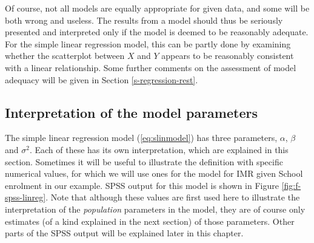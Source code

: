 \documentclass[11pt,a4paper,openany]{book}
\begin{document}
Of course, not all models are equally appropriate for given data, and
some will be both wrong and useless. The results from a model should
thus be seriously presented and interpreted only if the model is deemed
to be reasonably adequate. For the simple linear regression model, this
can be partly done by examining whether the scatterplot between \(X\)
and \(Y\) appears to be reasonably consistent with a linear
relationship. Some further comments on the assessment of model adequacy
will be given in Section \ref{s-regression-rest}.

\subsection{Interpretation of the model
parameters}\label{ss-regression-simple-int}

The simple linear regression model (\ref{eq:slinmodel}) has three
parameters, \(\alpha\), \(\beta\) and \(\sigma^{2}\). Each of these has
its own interpretation, which are explained in this section. Sometimes
it will be useful to illustrate the definition with specific numerical
values, for which we will use ones for the model for IMR given School
enrolment in our example. SPSS output for this model is shown in Figure
\ref{fig:f-spss-linreg}. Note that although these values are first used
here to illustrate the interpretation of the \emph{population}
parameters in the model, they are of course only estimates (of a kind
explained in the next section) of those parameters. Other parts of the
SPSS output will be explained later in this chapter.
\end{document}
